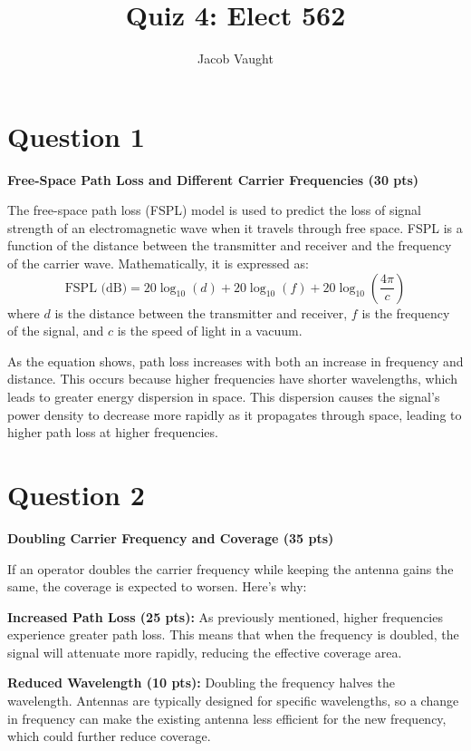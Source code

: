 \documentclass[12pt]{article}
\title{Quiz 4: Elect 562}
\author{Jacob Vaught}
\date{}
\begin{document}
\maketitle

\section*{Question 1}
\textbf{Free-Space Path Loss and Different Carrier Frequencies (30 pts)}

The free-space path loss (FSPL) model is used to predict the loss of signal strength of an electromagnetic wave when it travels through free space. FSPL is a function of the distance between the transmitter and receiver and the frequency of the carrier wave. Mathematically, it is expressed as:
\begin{equation}
    \text{FSPL (dB)} = 20\log_{10}(d) + 20\log_{10}(f) + 20\log_{10}\left(\frac{4\pi}{c}\right)
\end{equation}
where \( d \) is the distance between the transmitter and receiver, \( f \) is the frequency of the signal, and \( c \) is the speed of light in a vacuum.

As the equation shows, path loss increases with both an increase in frequency and distance. This occurs because higher frequencies have shorter wavelengths, which leads to greater energy dispersion in space. This dispersion causes the signal's power density to decrease more rapidly as it propagates through space, leading to higher path loss at higher frequencies.

\section*{Question 2}
\textbf{Doubling Carrier Frequency and Coverage (35 pts)}

If an operator doubles the carrier frequency while keeping the antenna gains the same, the coverage is expected to worsen. Here's why:

\textbf{Increased Path Loss (25 pts):} As previously mentioned, higher frequencies experience greater path loss. This means that when the frequency is doubled, the signal will attenuate more rapidly, reducing the effective coverage area.

\textbf{Reduced Wavelength (10 pts):} Doubling the frequency halves the wavelength. Antennas are typically designed for specific wavelengths, so a change in frequency can make the existing antenna less efficient for the new frequency, which could further reduce coverage.
\end{document}
